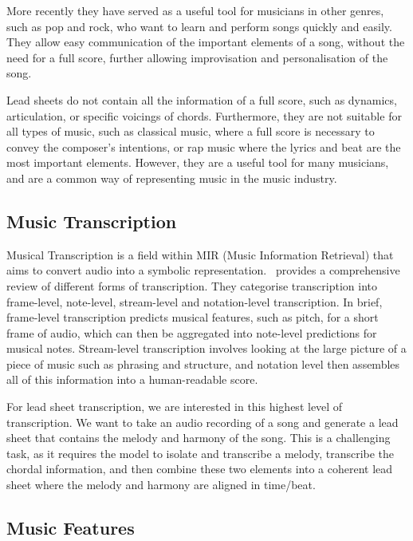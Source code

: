 More recently they have served as a useful tool for musicians in other genres, such as pop and rock, who want to learn and perform songs quickly and easily. They allow easy communication of the important elements of a song, without the need for a full score, further allowing improvisation and personalisation of the song.

Lead sheets do not contain all the information of a full score, such as dynamics, articulation, or specific voicings of chords. Furthermore, they are not suitable for all types of music, such as classical music, where a full score is necessary to convey the composer's intentions, or rap music where the lyrics and beat are the most important elements. However, they are a useful tool for many musicians, and are a common way of representing music in the music industry.

\subsection{Music Transcription}

Musical Transcription is a field within MIR (Music Information Retrieval) that aims to convert audio into a symbolic representation.~\cite{ComprehensiveReviewMusicTranscription} provides a comprehensive review of different forms of transcription. They categorise transcription into frame-level, note-level, stream-level and notation-level transcription. In brief, frame-level transcription predicts musical features, such as pitch, for a short frame of audio, which can then be aggregated into note-level predictions for musical notes. Stream-level transcription involves looking at the large picture of a piece of music such as phrasing and structure, and notation level then assembles all of this information into a human-readable score.

For lead sheet transcription, we are interested in this highest level of transcription. We want to take an audio recording of a song and generate a lead sheet that contains the melody and harmony of the song. This is a challenging task, as it requires the model to isolate and transcribe a melody, transcribe the chordal information, and then combine these two elements into a coherent lead sheet where the melody and harmony are aligned in time/beat.

\subsection{Music Features}

